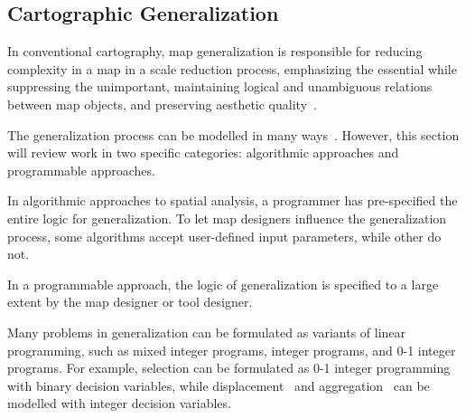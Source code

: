 \documentclass[11pt, oneside]{report}
\begin{document}
{\subsection{Cartographic Generalization}

In conventional cartography, map generalization is responsible for reducing complexity in a map in a scale reduction process, emphasizing the essential while suppressing the unimportant, maintaining logical and unambiguous relations between map objects, and preserving aesthetic quality~\cite{weibel1999generalising}.

The generalization process can be modelled in many ways~\cite{harrie2007modelling}. However, this section will review work in two specific categories: algorithmic approaches and programmable approaches.

In algorithmic approaches to spatial analysis, a programmer has pre-specified the entire logic for generalization. To let map designers influence the generalization process, some algorithms accept user-defined input parameters, while other do not.

In a programmable approach, the logic of generalization is specified to a large extent by the map designer or tool designer.

Many problems in generalization can be formulated as variants of linear programming, such as mixed integer programs, integer programs, and 0-1 integer programs. For example, selection can be formulated as 0-1 integer programming with binary decision variables, while displacement~\cite{ware2003generalization_sa} and aggregation~\cite{haunert2010area} can be modelled with integer decision variables.

}
\end{document}
